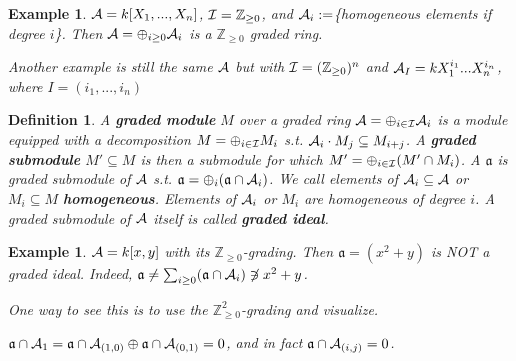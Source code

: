 \documentclass[11pt]{article}
\newtheorem{dfn}[thm]{Definition}
\newtheorem{ex}[thm]{Example}
\newcommand{\intg}{\mathbb Z}
\newcommand{\sca}{{\mathfrak a}}
\newcommand{\cala}{{\cal A}}
\newcommand{\cali}{{\cal I}}
\begin{document}
\begin{ex}
$\cala=k[X_1,...,X_n]$, $\cali=\intg_{\geq 0}$, and $\cala_i:=$\{homogeneous elements if degree $i$\}. Then $\cala=\oplus_{i\geq 0}\cala_i$ is a $\intg_{\geq 0}$ graded ring.

Another example is still the same $\cala$ but with $\cali=(\intg_{\geq 0})^n$ and $\cala_I=k X_1^{i_1}...X_n^{i_n}$, where $I=(i_1,...,i_n)$
\end{ex}

\begin{dfn}
A \textbf{graded module} $M$ over a graded ring $\cala=\oplus_{i\in \cali}\cala_i$ is a module equipped with a decomposition $M=\oplus_{i\in \cali } M_i$
 s.t. $\cala_i\cdot M_j\subseteq M_{i+j}$. A \textbf{graded submodule } $M'\subseteq M$ is then a submodule for which $M'=\oplus_{i\in \cali}(M'\cap M_i)$. A  $\sca$ is  graded submodule of $\cala$ s.t. $\sca=\oplus_i(\sca\cap \cala_i)$.
We call elements of $\cala_i\subseteq \cala$ or $ M_i\subseteq M$ \textbf{homogeneous}. Elements of $\cala_i$ or $M_i$ are homogeneous of degree $i$. A graded submodule of $\cala$ itself is called \textbf{graded ideal}.
\end{dfn}

\begin{ex}
$\cala=k[x,y]$ with its $\intg_{\geq 0}$-grading. Then $\sca=(x^2+y)$ is NOT a graded ideal. Indeed, $\sca\neq \sum_{i\geq 0}(\sca\cap \cala_i)\not\ni x^2+y$.

One way to see this is to use the $\intg^2_{\geq 0}$-grading and visualize. 

$\sca\cap\cala_1=\sca\cap\cala_{(1,0)}\oplus\sca\cap\cala_{(0,1)}=0$, and in fact $\sca\cap \cala_{(i,j)}=0$.
\end{ex}
\end{document}
